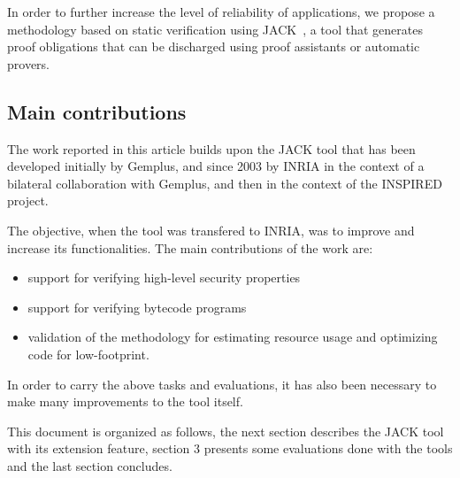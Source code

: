 In order to further increase the level of reliability of applications,
we propose a methodology based on static verification using
JACK~\cite{BRL-JACK}, a tool that generates proof obligations that
can be discharged using proof assistants or automatic provers.


\subsection{Main contributions}
The work reported in this article builds upon the JACK tool that has been developed initially by Gemplus, and since 2003 by INRIA
in the context of a bilateral collaboration with Gemplus, and then
in the context of the INSPIRED project.

The objective, when the tool was transfered to INRIA, was to improve and increase its functionalities. The main contributions of the work are:
\begin{itemize}
\item support for verifying high-level security properties
\item support for verifying bytecode programs
\item validation of the methodology for estimating resource
usage and optimizing code for low-footprint.
\end{itemize}
In order to carry the above tasks and evaluations, it has also
been necessary to make many improvements to the tool itself.

This document is organized as follows, the next section describes the JACK tool with its
extension feature, section 3 presents some evaluations done with the
tools and the last section concludes.
